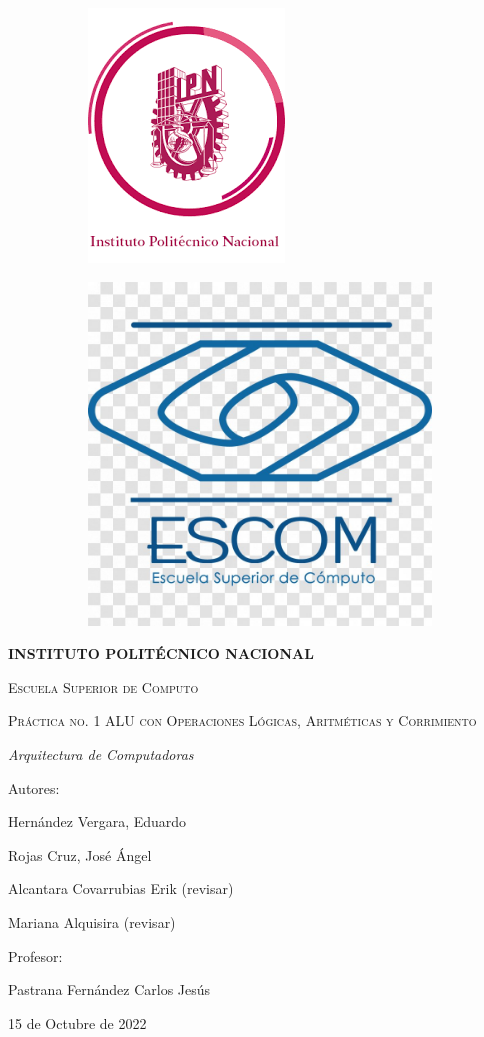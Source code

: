 	\begin{titlepage}
		\begin{figure}[!h]
			\begin{subfigure}{0.5\textwidth}
				\includegraphics[width=0.2\linewidth, inner]{logoIPN}
			\end{subfigure}
			\begin{subfigure}{0.5\textwidth}
				\includegraphics[width=0.2\linewidth, right]{logoESCOM}
			\end{subfigure}	
				
		\end{figure}		
		\centering
		\vspace{1cm}
		{\bfseries\LARGE INSTITUTO POLIT\'ECNICO NACIONAL \par}
		\vspace{1cm}
		{\scshape\Large Escuela Superior de Computo \par}
		\vspace{3cm}
		{\scshape\Huge Pr\'actica no. 1 ALU con Operaciones L\'ogicas, Aritm\'eticas y Corrimiento\par}
		\vspace{3cm}
		{\itshape\Large Arquitectura de Computadoras \par}
		\vfill
		{\Large Autores: \par}
		{\Large Hern\'andez Vergara, Eduardo \par}
		{\Large Rojas Cruz, Jos\'e \'Angel \par}
		{\Large Alcantara Covarrubias Erik (revisar) \par}
		{\Large Mariana Alquisira (revisar) \par}
		\vfill
		{\Large Profesor: \par}
		{\Large Pastrana Fern\'andez Carlos Jes\'us \par}
		\vfill
		{\Large 15 de Octubre de 2022 \par}
	\end{titlepage}
